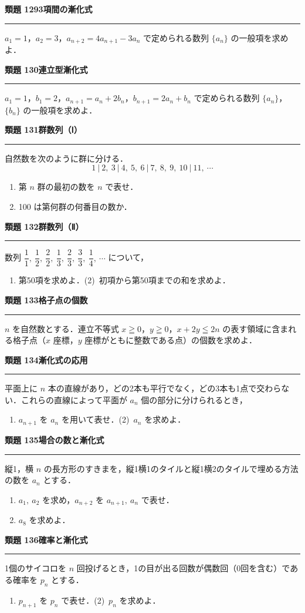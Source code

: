 \documentclass[a4paper,11pt]{ltjsarticle}
\newcommand{\mon}[2]{\Needspace{7\baselineskip}\vspace{10pt}%
  {\sffamily\bfseries 類題 #1\quad #2\par}\vspace{2pt}\hrule\vspace{4pt}}
\begin{document}
\mon{129}{3項間の漸化式}
$a_1=1$，$a_2=3$，$a_{n+2}=4a_{n+1}-3a_n$ で定められる数列 $\{a_n\}$ の一般項を求めよ．

\mon{130}{連立型漸化式}
$a_1=1$，$b_1=2$，$a_{n+1}=a_n+2b_n$，$b_{n+1}=2a_n+b_n$ で定められる数列 $\{a_n\}$，$\{b_n\}$ の一般項を求めよ．

\mon{131}{群数列（Ⅰ）}
自然数を次のように群に分ける．
\[1\ |\ 2,\ 3\ |\ 4,\ 5,\ 6\ |\ 7,\ 8,\ 9,\ 10\ |\ 11,\ \cdots\]
\begin{enumerate}
\item 第 $n$ 群の最初の数を $n$ で表せ．
\item 100 は第何群の何番目の数か．
\end{enumerate}

\mon{132}{群数列（Ⅱ）}
数列 $\dfrac11,\ \dfrac12,\ \dfrac22,\ \dfrac13,\ \dfrac23,\ \dfrac33,\ \dfrac14,\ \cdots$ について，
\begin{enumerate}
\item 第50項を求めよ．\qquad (2)\ 初項から第50項までの和を求めよ．
\end{enumerate}

\mon{133}{格子点の個数}
$n$ を自然数とする．連立不等式 $x\geqq0$，$y\geqq0$，$x+2y\leqq2n$ の表す領域に含まれる格子点（$x$ 座標，$y$ 座標がともに整数である点）の個数を求めよ．

\mon{134}{漸化式の応用}
平面上に $n$ 本の直線があり，どの2本も平行でなく，どの3本も1点で交わらない．これらの直線によって平面が $a_n$ 個の部分に分けられるとき，
\begin{enumerate}
\item $a_{n+1}$ を $a_n$ を用いて表せ．\qquad (2)\ $a_n$ を求めよ．
\end{enumerate}

\mon{135}{場合の数と漸化式}
縦1，横 $n$ の長方形のすきまを，縦1横1のタイルと縦1横2のタイルで埋める方法の数を $a_n$ とする．
\begin{enumerate}
\item $a_1,\ a_2$ を求め，$a_{n+2}$ を $a_{n+1},\ a_n$ で表せ．
\item $a_8$ を求めよ．
\end{enumerate}

\mon{136}{確率と漸化式}
1個のサイコロを $n$ 回投げるとき，1の目が出る回数が偶数回（0回を含む）である確率を $p_n$ とする．
\begin{enumerate}
\item $p_{n+1}$ を $p_n$ で表せ．\qquad (2)\ $p_n$ を求めよ．
\end{enumerate}
\end{document}
